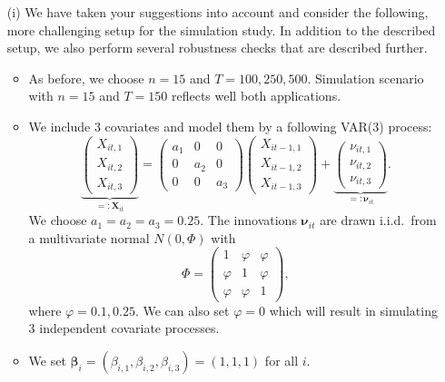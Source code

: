 \documentclass[a4paper,12pt]{article}
\begin{document}
\begin{enumerate}[label=\arabic*.,leftmargin=0.6cm]
{\color{blue}  
\begin{itemize}[topsep=0pt]
 
\item[(i)] We have taken your suggestions into account and consider the following, more challenging setup for the simulation study. In addition to the described setup, we also perform several robustness checks that are described further.

\begin{itemize}[label=--,leftmargin=0.45cm,itemsep=0pt]

\item As before, we choose $n=15$ and $T=100,250,500$. Simulation scenario with $n=15$ and $T=150$ reflects well both applications.
  
\item We include $3$ covariates and model them by a following VAR(3) process:
\[ \underbrace{\begin{pmatrix} X_{it,1} \\ X_{it,2} \\ X_{it,3} \end{pmatrix}}_{=: \boldsymbol{X}_{it}} = \begin{pmatrix} a_1 & 0 & 0 \\ 0 & a_2 & 0 \\ 0 & 0 & a_3 \end{pmatrix} \begin{pmatrix} X_{it-1,1} \\ X_{it-1,2} \\ X_{it-1,3} \end{pmatrix} + \underbrace{\begin{pmatrix} \nu_{it,1} \\ \nu_{it,2} \\ \nu_{it,3} \end{pmatrix}}_{=: \boldsymbol{\nu}_{it}}. \] 
We choose $a_1 = a_2 = a_3 = 0.25$. The innovations $\boldsymbol{\nu}_{it}$ are drawn i.i.d.\ from a multivariate normal $N(0,\Phi)$ with
\[ \Phi = \begin{pmatrix} 1 & \varphi & \varphi \\ \varphi & 1 & \varphi \\ \varphi & \varphi & 1 \end{pmatrix}, \]
where $\varphi=0.1, 0.25$. We can also set $\varphi = 0$ which will result in simulating 3 independent covariate processes. 

\item We set $\boldsymbol{\beta}_i = (\beta_{i,1},\beta_{i,2},\beta_{i,3}) = (1,1,1)$ for all $i$.


\end{itemize}
\end{itemize}}
\end{enumerate}
\end{document}
